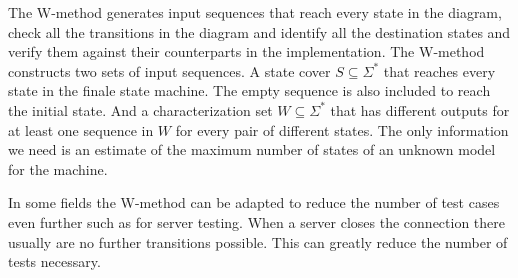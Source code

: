 \documentclass[multi,crop=false,class=article]{standalone}
\begin{document}
The W-method generates input sequences that reach every state in the
diagram, check all the transitions in the diagram and identify all the
destination states and verify them against their counterparts in
the implementation\cite{Ipate07}.
The W-method constructs two sets of input sequences.
A state cover $S \subseteq \Sigma^{*}$ that reaches every state in the
finale state machine.
The empty sequence is also included to reach the initial state.
And a characterization set $W \subseteq \Sigma^{*}$ that has different
outputs for at least one sequence in $W$ for every pair of different states.
The only information we need is an estimate of the maximum number of
states of an unknown model for the machine.

In some fields the W-method can be adapted to reduce the number of test
cases even further such as for server testing.
When a server closes the connection there usually are no further
transitions possible.
This can greatly reduce the number of tests necessary\cite{deRuiter15}.
\end{document}
